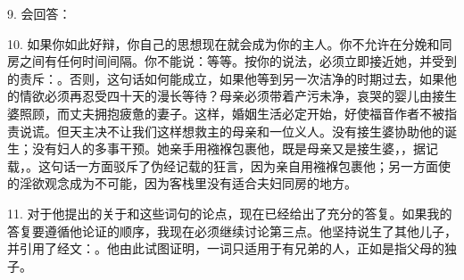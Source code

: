9. 会回答：\par

10. 如果你如此好辩，你自己的思想现在就会成为你的主人。你不允许在分娩和同房之间有任何时间间隔。你不能说：等等。按你的说法，必须立即接近她，并受到的责斥：。否则，这句话如何能成立，如果他等到另一次洁净的时期过去，如果他的情欲必须再忍受四十天的漫长等待？母亲必须带着产污未净，哀哭的婴儿由接生婆照顾，而丈夫拥抱疲惫的妻子。这样，婚姻生活必定开始，好使福音作者不被指责说谎。但天主决不让我们这样想救主的母亲和一位义人。没有接生婆协助他的诞生；没有妇人的多事干预。她亲手用襁褓包裹他，既是母亲又是接生婆，，据记载，。这句话一方面驳斥了伪经记载的狂言，因为亲自用襁褓包裹他；另一方面使的淫欲观念成为不可能，因为客栈里没有适合夫妇同房的地方。\par

11. 对于他提出的关于和这些词句的论点，现在已经给出了充分的答复。如果我的答复要遵循他论证的顺序，我现在必须继续讨论第三点。他坚持说生了其他儿子，并引用了经文：。他由此试图证明，一词只适用于有兄弟的人，正如是指父母的独子。\par

